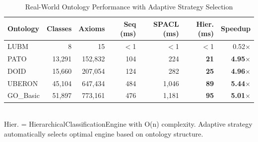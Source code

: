 


\begin{table}[htbp]
\centering
\caption{Real-World Ontology Performance with Adaptive Strategy Selection}
\label{tab:realworld}
\begin{tabular}{l|r|r|r|r|r|r}
\toprule
\textbf{Ontology} & \textbf{Classes} & \textbf{Axioms} & \textbf{Seq (ms)} & \textbf{SPACL (ms)} & \textbf{Hier. (ms)} & \textbf{Speedup} \\
\midrule
LUBM & 8 & 15 & $<$1 & $<$1 & $<$1 & 0.52$\times$ \\
PATO & 13,291 & 152,832 & 104 & 224 & \textbf{21} & \textbf{4.95$\times$} \\
DOID & 15,660 & 207,054 & 124 & 282 & \textbf{25} & \textbf{4.96$\times$} \\
UBERON & 45,104 & 647,434 & 484 & 1,046 & \textbf{89} & \textbf{5.44$\times$} \\
GO\_Basic & 51,897 & 773,161 & 476 & 1,181 & \textbf{95} & \textbf{5.01$\times$} \\
\bottomrule
\end{tabular}
\\{\small Hier. = HierarchicalClassificationEngine with O(n) complexity. 
Adaptive strategy automatically selects optimal engine based on ontology structure.}
\end{table}

